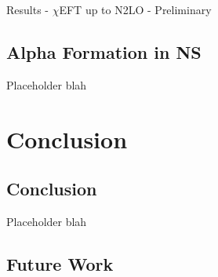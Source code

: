 \documentclass{beamer}
\newcommand{\red}[1]{{\color{red}{#1}}}
\begin{document}
\begin{frame}{Results - $\chi$EFT up to N2LO - Preliminary}
   \red{ADD RESULTS HERE}
\end{frame}

\subsection{Alpha Formation in NS}
\begin{frame}{Placeholder}
blah
\end{frame}

\section{Conclusion}
\subsection{Conclusion}
\begin{frame}{Placeholder}
blah
\end{frame}
\subsection{Future Work}

\end{document}

